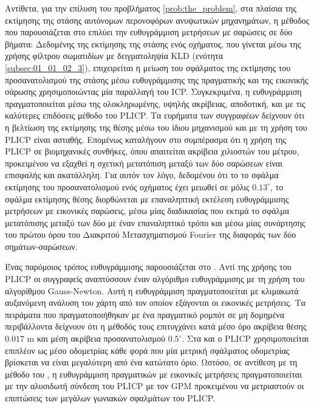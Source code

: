 Αντίθετα, για την επίλυση του προβλήματος \ref{prob:the_problem}, στα πλαίσια
της εκτίμησης της στάσης αυτόνομων περονοφόρων ανυψωτικών μηχανημάτων, η
μέθοδος που παρουσιάζεται στο \cite{Vasiljevic2016a} επιλύει την ευθυγράμμιση
μετρήσεων με σαρώσεις σε δύο βήματα: Δεδομένης της εκτίμησης της στάσης ενός
οχήματος, που γίνεται μέσω της χρήσης φίλτρου σωματιδίων με δειγματοληψία KLD
(ενότητα \ref{subsec:01_01_02_3}), επιχειρείται η μείωση του σφάλματος της
εκτίμησης του προσανατολισμού της στάσης μέσω ευθυγράμμισης της πραγματικής και
της εικονικής σάρωσης χρησιμοποιώντας μία παραλλαγή του ICP. Συγκεκριμένα, η
ευθυγράμμιση πραγματοποιείται μέσω της ολοκληρωμένης, υψηλής ακρίβειας,
αποδοτική, και με τις καλύτερες επιδόσεις μέθοδο του PLICP.  Τα ευρήματα των
συγγραφέων δείχνουν ότι η βελτίωση της εκτίμησης της θέσης μέσω του ίδιου
μηχανισμού και με τη χρήση του PLICP είναι ασταθής. Επομένως καταλήγουν στο
συμπέρασμα ότι η χρήση της PLICP σε βιομηχανικές συνθήκες, όπου απαιτείται
ακρίβεια χιλιοστών του μέτρου, προκειμένου να εξαχθεί η σχετική μετατόπιση
μεταξύ των δύο σαρώσεων είναι επισφαλής και ακατάλληλη. Για αυτόν τον λόγο,
δεδομένου ότι το το σφάλμα εκτίμησης του προσανατολισμού ενός οχήματος έχει
μειωθεί σε μόλις $0.13^\circ$, το σφάλμα εκτίμησης θέσης διορθώνεται με
επαναληπτική εκτέλεση ευθυγράμμισης μετρήσεων με εικονικές σαρώσεις, μέσω μίας
διαδικασίας που εκτιμά το σφάλμα μετατόπισης μεταξύ των δύο με έναν
επαναληπτικό τρόπο και μέσω μίας συνάρτησης του πρώτου όρου του Διακριτού
Μετασχηματισμού Fourier της διαφοράς των δύο σημάτων-σαρώσεων.

Ένας παρόμοιος τρόπος ευθυγράμμισης παρουσιάζεται στο \cite{Peng2018a}. Αντί
της χρήσης του PLICP οι συγγραφείς αναπτύσσουν έναν αλγόριθμο ευθυγράμμισης με
τη χρήση του αλγορίθμου Gauss-Newton.  Αυτή η ευθυγράμμιση πραγματοποιείται με
κλιμακωτά αυξανόμενη ανάλυση του χάρτη από τον οποίον εξάγονται οι εικονικές
μετρήσεις.  Τα πειράματα που πραγματοποιήθηκαν με ένα πραγματικό ρομπότ σε μη
δομημένα περιβάλλοντα δείχνουν ότι η μέθοδός τους επιτυγχάνει κατά μέσο όρο
ακρίβεια θέσης $0.017$ m και μέση ακρίβεια προσανατολισμού $0.5^\circ$. Στα
\cite{Chen2019a} και \cite{Liu2019a} ο PLICP χρησιμοποιείται επιπλέον ως μέσο
οδομετρίας κάθε φορά που μία μετρική σφάλματος οδομετρίας βρίσκεται να είναι
μεγαλύτερη από ένα κατώτατο όριο. Ωστόσο, σε αντίθεση με τη μέθοδο του
\cite{Peng2018a}, η ευθυγράμμιση πραγματικών με εικονικές μετρήσεις
πραγματοποιείται με την αλυσιδωτή σύνδεση του PLICP με τον GPM \cite{Censib}
προκειμένου να μετριαστούν οι επιπτώσεις των μεγάλων γωνιακών σφαλμάτων του
PLICP.


